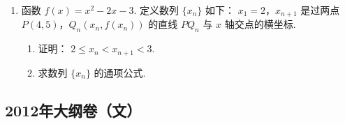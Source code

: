 \begin{description}
\begin{enumerate}[leftmargin=5pt]
        \item 函数 \( f(x) = x^2 - 2x - 3 \). 定义数列 \( \{x_n\} \) 如下： \(x_1 = 2\)，\(x_{n+1}\) 是过两点 \(P(4,5)\)，\(Q_n(x_n, f(x_n))\) 的直线 \( PQ_n \) 与 \( x \) 轴交点的横坐标.
\begin{enumerate}
\item 证明： \(2 \leqslant x_{n} < x_{n+1} < 3\).
\item 求数列 \(\{x_{n}\}\) 的通项公式.
\end{enumerate}

    \end{enumerate}

\end{description}


\subsection{2012年大纲卷（文）}\label{gk:2012年大纲卷（文）}

